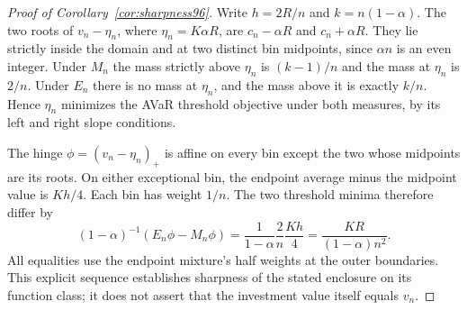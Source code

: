 \begin{proof}[Proof of Corollary~\ref{cor:sharpness96}]
Write $h=2R/n$ and $k=n(1-\alpha)$. The two roots of $v_n-\eta_n$, where $\eta_n=K\alpha R$, are $c_n-\alpha R$ and $c_n+\alpha R$. They lie strictly inside the domain and at two distinct bin midpoints, since $\alpha n$ is an even integer. Under $M_n$ the mass strictly above $\eta_n$ is $(k-1)/n$ and the mass at $\eta_n$ is $2/n$. Under $E_n$ there is no mass at $\eta_n$, and the mass above it is exactly $k/n$. Hence $\eta_n$ minimizes the AVaR threshold objective under both measures, by its left and right slope conditions.

The hinge $\phi=(v_n-\eta_n)_+$ is affine on every bin except the two whose midpoints are its roots. On either exceptional bin, the endpoint average minus the midpoint value is $Kh/4$. Each bin has weight $1/n$. The two threshold minima therefore differ by
\[
 (1-\alpha)^{-1}(E_n\phi-M_n\phi)
 =\frac{1}{1-\alpha}\frac{2}{n}\frac{Kh}{4}
 =\frac{KR}{(1-\alpha)n^2}.
\]
All equalities use the endpoint mixture's half weights at the outer boundaries. This explicit sequence establishes sharpness of the stated enclosure on its function class; it does not assert that the investment value itself equals $v_n$.
\end{proof}
